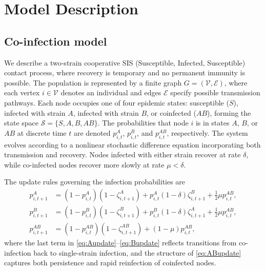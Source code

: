 \documentclass[a4paper,12pt]{scrartcl}
\theoremstyle{plain}%
\theoremstyle{definition}
\theoremstyle{remark}
\numberwithin{equation}{section}
\begin{document}
\section{Model Description}
\subsection{Co-infection model}

We describe a two-strain cooperative SIS (Susceptible, Infected, Susceptible) contact process, where recovery is temporary and no permanent immunity is possible. The population is represented by a finite graph \( G = (\mathcal{V}, \mathcal{E}) \), where each vertex \( i \in \mathcal{V} \) denotes an individual and edges \( \mathcal{E} \) specify possible transmission pathways. Each node occupies one of four epidemic states: susceptible (\(S\)), infected with strain \(A\), infected with strain \(B\), or coinfected (\(AB\)), forming the state space \( \mathcal{S} = \{S, A, B, AB\} \). The probabilities that node \(i\) is in states \(A\), \(B\), or \(AB\) at discrete time \(t\) are denoted \(p_{i,t}^A\), \(p_{i,t}^B\), and \(p_{i,t}^{AB}\), respectively. The system evolves according to a nonlinear stochastic difference equation incorporating both transmission and recovery. Nodes infected with either strain recover at rate \(\delta\), while co-infected nodes recover more slowly at rate \(\mu < \delta\). 

The update rules governing the infection probabilities are
\begin{align}
p_{i,t+1}^A &= (1 - p_{i,t}^A)(1 - \zeta_{i,t+1}^A) + p_{i,t}^A (1-\delta)\zeta_{i,t+1}^B + \tfrac{1}{2}\mu p_{i,t}^{AB}, \label{eq:Aupdate} \\
p_{i,t+1}^B &= (1 - p_{i,t}^B)(1 - \zeta_{i,t+1}^B) + p_{i,t}^B (1-\delta)\zeta_{i,t+1}^A + \tfrac{1}{2}\mu p_{i,t}^{AB}, \label{eq:Bupdate} \\
p_{i,t+1}^{AB} &= (1 - p_{i,t}^{AB})(1 - \zeta_{i,t+1}^{AB}) + (1-\mu)p_{i,t}^{AB}, \label{eq:ABupdate}
\end{align}
where the last term in \eqref{eq:Aupdate}–\eqref{eq:Bupdate} reflects transitions from co-infection back to single-strain infection, and the structure of \eqref{eq:ABupdate} captures both persistence and rapid reinfection of coinfected nodes.
\end{document}
